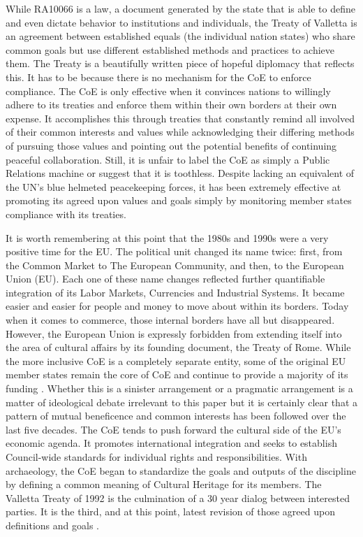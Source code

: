 \documentclass[english]{ijsra}
\begin{document}
While RA10066 is a law, a document generated by the state that is able to define and even dictate behavior to institutions and individuals, the Treaty of Valletta is an agreement between established equals (the individual nation states) who share common goals but use different established methods and practices to achieve them. The Treaty is a beautifully written piece of hopeful diplomacy that reflects this. It has to be because there is no mechanism for the CoE to enforce compliance. The CoE is only effective when it convinces nations to willingly adhere to its treaties and enforce them within their own borders at their own expense. It accomplishes this through treaties that constantly remind all involved of their common interests and values while acknowledging their differing methods of pursuing those values and pointing out the potential benefits of continuing peaceful collaboration. Still, it is unfair to label the CoE as simply a Public Relations machine or suggest that it is toothless. Despite lacking an equivalent of the UN’s blue helmeted peacekeeping forces, it has been extremely effective at promoting its agreed upon values and goals simply by monitoring member states compliance with its treaties.   

It is worth remembering at this point that the 1980s and 1990s were a very positive time for the EU. The political unit changed its name twice: first, from the Common Market to The European Community, and then, to the European Union (EU). Each one of these name changes reflected further quantifiable integration of its Labor Markets, Currencies and Industrial Systems. It became easier and easier for people and money to move about within its borders. Today when it comes to commerce, those internal borders have all but disappeared. However, the European Union is expressly forbidden from extending itself into the area of cultural affairs by its founding document, the Treaty of Rome. While the more inclusive CoE is a completely separate entity, some of the original EU member states remain the core of CoE and continue to provide a majority of its funding \parencite[74]{CoE_2000}. 
Whether this is a sinister arrangement or a pragmatic arrangement is a matter of ideological debate irrelevant to this paper but it is certainly clear that a pattern of mutual beneficence and common interests has been followed over the last five decades. The CoE tends to push forward the cultural side of the EU’s economic agenda. It promotes international integration and seeks to establish Council-wide standards for individual rights and responsibilities. With archaeology, the CoE began to standardize the goals and outputs of the discipline by defining a common meaning of Cultural Heritage for its members. The Valletta Treaty of 1992 is the culmination of a 30 year dialog between interested parties. It is the third, and at this point, latest revision of those agreed upon definitions and goals \parencite{Valletta_1992}. 
\end{document}
